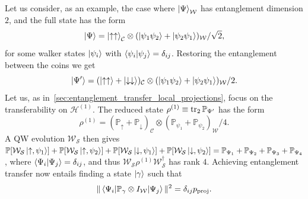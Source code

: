 \documentclass[
	aps, pra,
	superscriptaddress, twocolumn,
	floatfix,
	10pt
]{revtex4-1}
\newcommand{\on}[1]{\operatorname{#1}}
\newcommand{\parTitle}[1]{\noindent{\color{Mahogany}(\emph{#1})}}
\newcommand{\PP}{\mathbb{P}}
\newcommand{\calC}{{\mathcal{C}}}
\newcommand{\calH}{{\mathcal{H}}}
\newcommand{\calS}{{\mathcal{S}}}
\newcommand{\calW}{{\mathcal{W}}}
\newcommand{\commale}[1]{{\textcolor{red} {\it{[Note (Ale): #1]}}}}
\renewcommand{\parTitle}[1]{}
\begin{document}
\parTitle{Entanglement accumulation, problem statement}
Let us consider, as an example, the case where $\ket{\Psi}_\calW$ has entanglement dimension $2$, and the full state has the form
\begin{equation}
	 \ket{\Psi} =
	\ket{\uparrow\uparrow}_{\calC}
	\otimes
	(\ket{\psi_1\psi_2} + \ket{\psi_2\psi_1})_{\calW}/\sqrt2,
\end{equation}
for some walker states $\ket{\psi_i}$ with $\braket{\psi_i}{\psi_j}=\delta_{ij}$.
Restoring the entanglement between the coins we get
\begin{equation}
	\ket{\Psi'} =
	(\ket{\uparrow\uparrow}+ \ket{\downarrow\downarrow})_{\calC}
	\otimes
	(\ket{\psi_1\psi_2} + \ket{\psi_2\psi_1})_{\calW}/2.
	\label{eq:ent_acc_initial_state}
\end{equation}
Let us, as in~\cref{sec:entanglement_transfer_local_projections}, focus on the transferability on $\calH^{(1)}$.
The reduced state $\rho^{(1)}\equiv\tr_2\PP_{\Psi'}$ has the form
\begin{equation}
	\rho^{(1)} =
	(\PP_\uparrow + \PP_\downarrow)_\calC
	\otimes
	(\PP_{\psi_1} + \PP_{\psi_2})_\calW/4.
\end{equation}
A QW evolution $\calW_{\calS}$ then gives
$\PP[\calW_{\calS}\ket{\uparrow,\psi_1}] + 
	\PP[\calW_{\calS}\ket{\uparrow,\psi_2}] + 
	\PP[\calW_{\calS}\ket{\downarrow,\psi_1}] + 
	\PP[\calW_{\calS}\ket{\downarrow,\psi_2}]= \PP_{\Psi_1} + \PP_{\Psi_2} + \PP_{\Psi_3} + \PP_{\Psi_4}$,
where $\braket{\Psi_i}{\Psi_j}=\delta_{ij}$, and thus $\calW_{\calS}\rho^{(1)}\calW_{\calS}^\dagger$ has rank $4$.
Achieving entanglement transfer now entails finding a state $\ket\gamma$ such that
\begin{equation}
	\|\mel{\Psi_i}{\PP_\gamma\otimes I_\calW}{\Psi_j}\|^2 = \delta_{ij} p_{\on{proj}}.
\end{equation}
\end{document}
